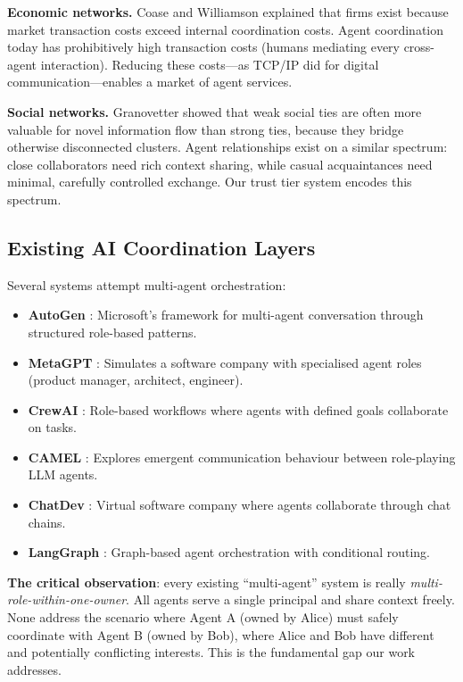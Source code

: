 \textbf{Economic networks.} Coase \cite{coase1937firm} and Williamson \cite{williamson1975markets} explained that firms exist because market transaction costs exceed internal coordination costs. Agent coordination today has prohibitively high transaction costs (humans mediating every cross-agent interaction). Reducing these costs---as TCP/IP did for digital communication---enables a market of agent services.

\textbf{Social networks.} Granovetter \cite{granovetter1973weak} showed that weak social ties are often more valuable for novel information flow than strong ties, because they bridge otherwise disconnected clusters. Agent relationships exist on a similar spectrum: close collaborators need rich context sharing, while casual acquaintances need minimal, carefully controlled exchange. Our trust tier system encodes this spectrum.

\subsection{Existing AI Coordination Layers}

Several systems attempt multi-agent orchestration:

\begin{itemize}
    \item \textbf{AutoGen} \cite{wu2023autogen}: Microsoft's framework for multi-agent conversation through structured role-based patterns.
    \item \textbf{MetaGPT} \cite{hong2023metagpt}: Simulates a software company with specialised agent roles (product manager, architect, engineer).
    \item \textbf{CrewAI} \cite{crewai2024}: Role-based workflows where agents with defined goals collaborate on tasks.
    \item \textbf{CAMEL} \cite{li2023camel}: Explores emergent communication behaviour between role-playing LLM agents.
    \item \textbf{ChatDev} \cite{qian2023chatdev}: Virtual software company where agents collaborate through chat chains.
    \item \textbf{LangGraph} \cite{langgraph2024}: Graph-based agent orchestration with conditional routing.
\end{itemize}

\textbf{The critical observation}: every existing ``multi-agent'' system is really \textit{multi-role-within-one-owner}. All agents serve a single principal and share context freely. None address the scenario where Agent A (owned by Alice) must safely coordinate with Agent B (owned by Bob), where Alice and Bob have different and potentially conflicting interests. This is the fundamental gap our work addresses.


